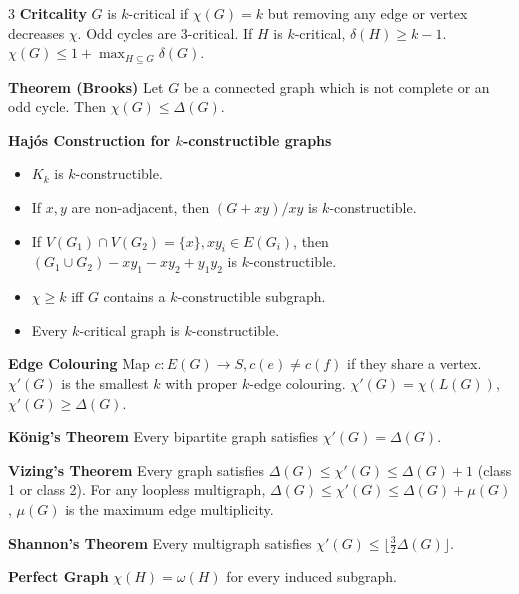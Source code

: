\documentclass[10pt, landscape]{article}
\begin{document}
\begin{multicols*}{3}
\textbf{Critcality} $G$ is $k$-critical if $\chi(G)=k$ but removing any edge or vertex decreases $\chi$. Odd cycles are $3$-critical. If $H$ is $k$-critical, $\delta(H) \geq k-1$. $\chi(G) \leq 1 + \max_{H \subseteq G}\delta(G)$.

\textbf{Theorem (Brooks)} Let $G$ be a connected graph which is not complete or an odd cycle. Then $\chi(G) \leq \Delta(G)$.

\textbf{Hajós Construction for $k$-constructible graphs}
\begin{itemize}
    \item $K_k$ is $k$-constructible.
    \item If $x, y$ are non-adjacent, then $(G+xy)/xy$ is $k$-constructible.
    \item If $V(G_1) \cap V(G_2)=\{x\}, xy_i\in E(G_i)$, then $(G_1 \cup G_2)-xy_1-xy_2+y_1y_2$ is $k$-constructible.
    \item $\chi \geq k$ iff $G$ contains a $k$-constructible subgraph.
    \item Every $k$-critical graph is $k$-constructible.
\end{itemize}

\textbf{Edge Colouring} Map $c:E(G) \rightarrow S, c(e) \neq c(f)$ if they share a vertex. $\chi'(G)$ is the smallest $k$ with proper $k$-edge colouring. $\chi'(G)=\chi(L(G))$, $\chi'(G) \geq \Delta(G)$.

\textbf{König's Theorem} Every bipartite graph satisfies $\chi'(G) = \Delta(G)$.

\textbf{Vizing's Theorem} Every graph satisfies $\Delta(G) \leq \chi'(G) \leq \Delta(G)+1$ (class 1 or class 2). For any loopless multigraph, $\Delta(G) \leq \chi'(G) \leq \Delta(G) + \mu(G)$, $\mu(G)$ is the maximum edge multiplicity.

\textbf{Shannon's Theorem} Every multigraph satisfies $\chi'(G) \leq \lfloor \frac{3}{2}\Delta(G) \rfloor$.

\textbf{Perfect Graph} $\chi(H) = \omega(H)$ for every induced subgraph.




\end{multicols*}
\end{document}

